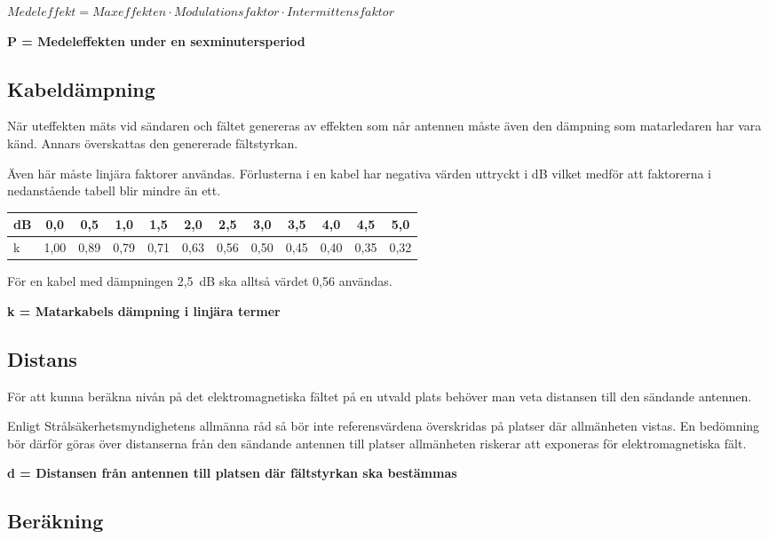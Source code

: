 \(Medeleffekt = Maxeffekten \cdot Modulationsfaktor \cdot Intermittensfaktor\)

\textbf{P = Medeleffekten under en sexminutersperiod}

\subsection{Kabeldämpning}

När uteffekten mäts vid sändaren och fältet genereras av effekten som
når antennen måste även den dämpning som matarledaren har vara känd.
Annars överskattas den genererade fältstyrkan.

Även här måste linjära faktorer användas.
Förlusterna i en kabel har negativa värden uttryckt i dB vilket medför att
faktorerna i nedanstående tabell blir mindre än ett.

\begin{tabular}{|l|c|c|c|c|c|c|c|c|c|c|c|}
	\hline
	dB & 0,0  & 0,5  & 1,0  & 1,5  & 2,0  & 2,5  & 3,0  & 3,5  & 4,0  & 4,5  & 5,0 \\ \hline
	k  & 1,00 & 0,89 & 0,79 & 0,71 & 0,63 & 0,56 & 0,50 & 0,45 & 0,40 & 0,35 & 0,32 \\ \hline
\end{tabular}

För en kabel med dämpningen 2,5~dB ska alltså värdet 0,56 användas.

\textbf{k = Matarkabels dämpning i linjära termer}

\subsection{Distans}

För att kunna beräkna nivån på det elektromagnetiska fältet på en utvald plats
behöver man veta distansen till den sändande antennen.

Enligt Strålsäkerhetsmyndighetens allmänna råd så bör inte referensvärdena
överskridas på platser där allmänheten vistas.
En bedömning bör därför göras över distanserna från den sändande antennen till
platser allmänheten riskerar att exponeras för elektromagnetiska fält.

\textbf{d = Distansen från antennen till platsen där fältstyrkan ska bestämmas}

\subsection{Beräkning}

